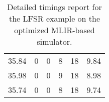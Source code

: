 \begin{table}[h]
{\begin{tabular}{cccccc}
            35.84              & 0                          & 0                          & 8                          & 18                         & 9.84                   \\
            35.98              & 0                          & 0                          & 9                          & 18                         & 8.98                   \\
            35.74              & 0                          & 0                          & 8                          & 18                         & 9.74                   \\
            \bottomrule
        \end{tabular}
    }
    \caption{Detailed timings report for the LFSR example on the optimized MLIR-based simulator.}
\end{table}

